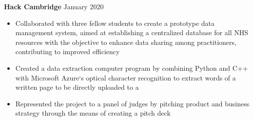 \documentclass{article}
\begin{document}


\textbf{Hack Cambridge} \hfill January 2020
\begin{itemize}
    \item Collaborated with three fellow students to create a prototype data management system, aimed at establishing a centralized database for all NHS resources with the objective to enhance data sharing among practitioners, contributing to improved efficiency
    \item Created a data extraction computer program by combining Python and C++ with Microsoft Azure`s optical character recognition to extract words of a written page to be directly uploaded to a 
    \item Represented the project to a panel of judges by pitching product and business strategy through the means of creating a pitch deck
\end{itemize} \medskip
\end{document}
